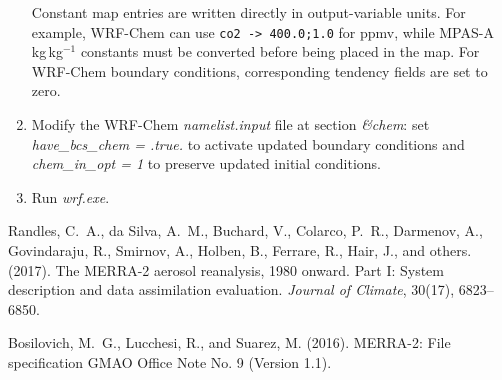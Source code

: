 \documentclass{article}
\newcommand{\hack}[1]{#1}
\begin{document}
\begin{enumerate}
Constant map entries are written directly in output-variable units. For example, WRF-Chem can use \texttt{co2 -> 400.0;1.0} for ppmv, while MPAS-A kg\,kg$^{-1}$ constants must be converted before being placed in the map. For WRF-Chem boundary conditions, corresponding tendency fields are set to zero.
\item Modify the WRF-Chem \textit{namelist.input} file at section \textit{\&chem}: set \textit{have\_bcs\_chem = .true.} to activate updated boundary conditions and \textit{chem\_in\_opt = 1} to preserve updated initial conditions.
\item Run \textit{wrf.exe}.
\end{enumerate}

\hack{\newpage}
\begin{thebibliography}{99}
Randles, C.~A., da Silva, A.~M., Buchard, V., Colarco, P.~R., Darmenov, A.,
Govindaraju, R., Smirnov, A., Holben, B., Ferrare, R., Hair, J., and others.
(2017).
The MERRA-2 aerosol reanalysis, 1980 onward. Part I: System description and
data assimilation evaluation.
\textit{Journal of Climate}, 30(17), 6823--6850.

Bosilovich, M.~G., Lucchesi, R., and Suarez, M. (2016).
MERRA-2: File specification GMAO Office Note No. 9 (Version 1.1).
\end{thebibliography}
\end{document}
